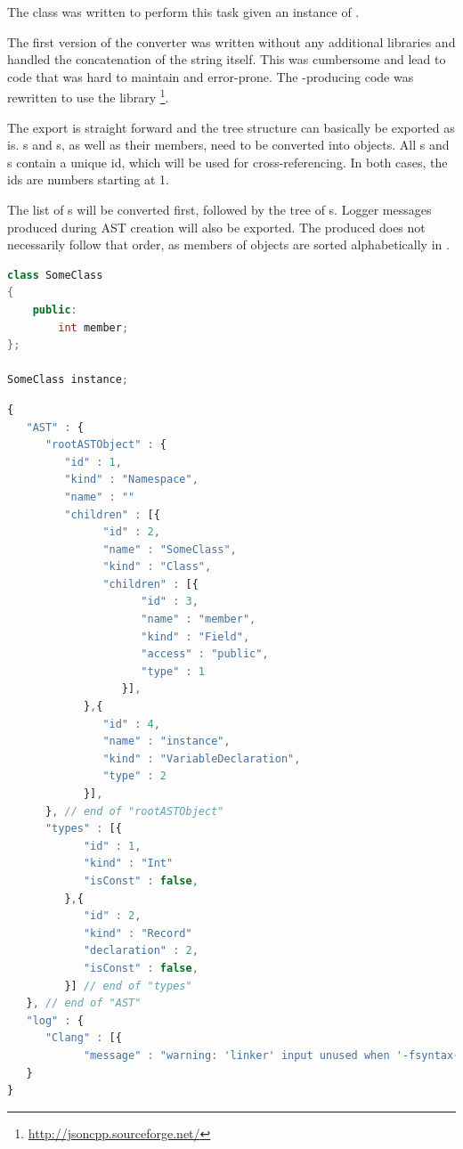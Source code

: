 The class  was written to perform this task given an instance of \linebreak{}.

The first version of the converter was written without any additional libraries and handled the concatenation of the  string itself. This was cumbersome and lead to code that was hard to maintain and error-prone. The -producing code was rewritten to use the library \footnote{\url{http://jsoncpp.sourceforge.net/}}.

The export is straight forward and the tree structure can basically be exported as is. s and s, as well as their members, need to be converted into  objects. All s and s contain a unique id, which will be used for cross-referencing. In both cases, the ids are numbers starting at 1.

The list of s will be converted first, followed by the tree of s. Logger messages produced during AST creation will also be exported. The produced  does not necessarily follow that order, as members of  objects are sorted alphabetically in .

\SingleSpacing
\begin{lstlisting}[language=C++, caption=Example AST for \myProperName{JSON} conversion]
class SomeClass
{
	public:
		int member;
};

SomeClass instance;
\end{lstlisting}
\OnehalfSpacing

\newpage
\SingleSpacing
\begin{lstlisting}[language=JavaScript, caption=AST converted to \myProperName{JSON} (reduced example), label=listing:JSON]
{
   "AST" : {
      "rootASTObject" : {
         "id" : 1,
         "kind" : "Namespace",
         "name" : ""
         "children" : [{
               "id" : 2,
               "name" : "SomeClass",
               "kind" : "Class",
               "children" : [{
                     "id" : 3,
                     "name" : "member",
                     "kind" : "Field",
                     "access" : "public",
                     "type" : 1
                  }],
            },{
               "id" : 4,
               "name" : "instance",
               "kind" : "VariableDeclaration",
               "type" : 2
            }],
      }, // end of "rootASTObject"
      "types" : [{
            "id" : 1,
            "kind" : "Int"
            "isConst" : false,
         },{
            "id" : 2,
            "kind" : "Record"		 
            "declaration" : 2,
            "isConst" : false,
         }] // end of "types"
   }, // end of "AST"
   "log" : {
      "Clang" : [{
            "message" : "warning: 'linker' input unused when '-fsyntax-only' is present", "type" : "Warning" }]
   }
}
\end{lstlisting}
\OnehalfSpacing

